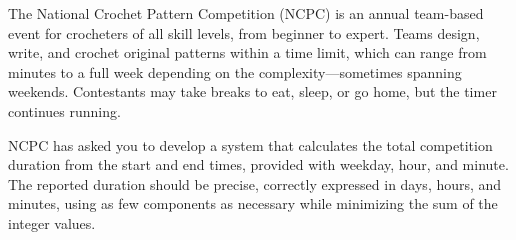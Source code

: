 



The National Crochet Pattern Competition (NCPC) is an annual team-based event for crocheters of all skill levels, from beginner to expert.
Teams design, write, and crochet original patterns within a time limit, which can range from minutes to a full week depending on the complexity---sometimes spanning weekends.
Contestants may take breaks to eat, sleep, or go home, but the timer continues running.

NCPC has asked you to develop a system that calculates the total competition duration from the start and end times, provided with weekday, hour, and minute.
The reported duration should be precise, correctly expressed in days, hours, and minutes, using as few components as necessary while minimizing the sum of the integer values.

